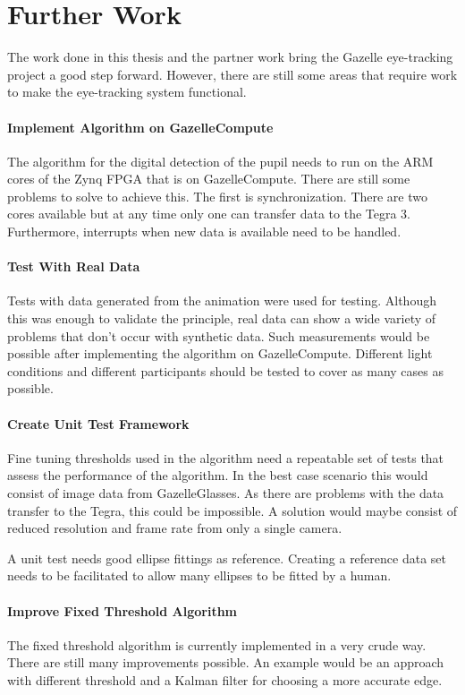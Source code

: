 \chapter{Further Work}
\label{chap:outlook}
The work done in this thesis and the partner work bring the Gazelle eye-tracking project a good step forward. However, there are still some areas that require work to make the eye-tracking system functional.

\subsubsection{Implement Algorithm on GazelleCompute}

The algorithm for the digital detection of the pupil needs to run on the \gls{ARM} cores of the Zynq \gls{FPGA} that is on GazelleCompute. There are still some problems to solve to achieve this. The first is synchronization. There are two cores available but at any time only one can transfer data to the Tegra 3. Furthermore, interrupts when new data is available need to be handled.

\subsubsection{Test With Real Data}

Tests with data generated from the animation were used for testing. Although this was enough to validate the principle, real data can show a wide variety of problems that don't occur with synthetic data. Such measurements would be possible after implementing the algorithm on GazelleCompute. Different light conditions and different participants should be tested to cover as many cases as possible.

\subsubsection{Create Unit Test Framework}

Fine tuning thresholds used in the algorithm need a repeatable set of tests that assess the performance of the algorithm. In the best case scenario this would consist of image data from GazelleGlasses. As there are problems with the data transfer to the Tegra, this could be impossible. A solution would maybe consist of reduced resolution and frame rate from only a single camera.

A unit test needs good ellipse fittings as reference. Creating a reference data set needs to be facilitated to allow many ellipses to be fitted by a human.

\subsubsection{Improve Fixed Threshold Algorithm}

The fixed threshold algorithm is currently implemented in a very crude way. There are still many improvements possible. An example would be an approach with different threshold and a Kalman filter for choosing a more accurate edge.